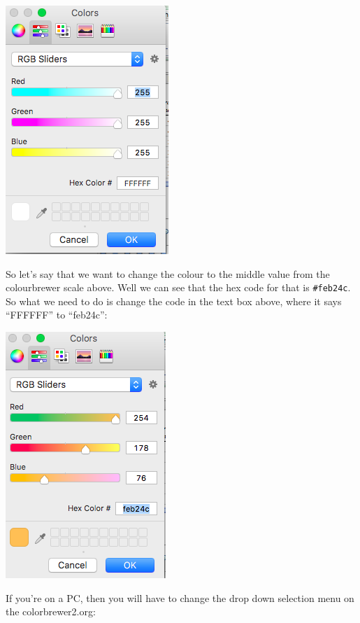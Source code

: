 \documentclass[
]{book}
\begin{document}
\includegraphics{imgs/manual_fill_4.png}

So let's say that we want to change the colour to the middle value from the colourbrewer scale above. Well we can see that the hex code for that is \texttt{\#feb24c}. So what we need to do is change the code in the text box above, where it says ``FFFFFF'' to ``feb24c'':

\includegraphics{imgs/manual_fill_5.png}

If you're on a PC, then you will have to change the drop down selection menu on the colorbrewer2.org:
\end{document}
